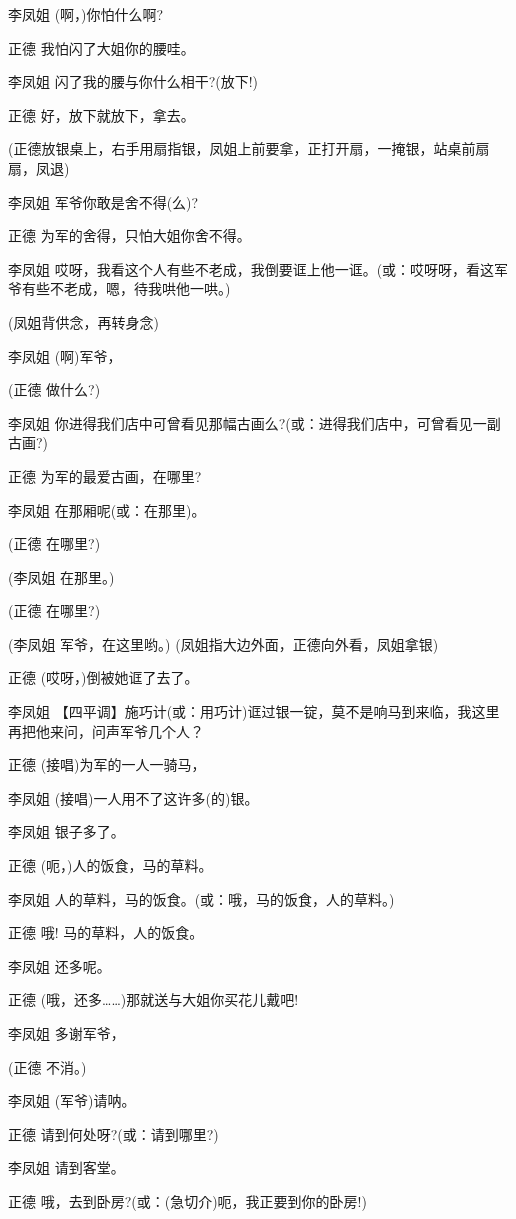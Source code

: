李凤姐 (啊，)你怕什么啊?

正德 我怕闪了大姐你的腰哇。

李凤姐 闪了我的腰与你什么相干?(放下!)

正德 好，放下就放下，拿去。

(正德放银桌上，右手用扇指银，凤姐上前要拿，正打开扇，一掩银，站桌前扇扇，凤退)

李凤姐 军爷你敢是舍不得(么)?

正德 为军的舍得，只怕大姐你舍不得。

李凤姐
哎呀，我看这个人有些不老成，我倒要诓上他一诓。(或：哎呀呀，看这军爷有些不老成，嗯，待我哄他一哄。)

(凤姐背供念，再转身念)

李凤姐 (啊)军爷，

(正德 做什么?)

李凤姐
你进得我们店中可曾看见那幅古画么?(或：进得我们店中，可曾看见一副古画?)

正德 为军的最爱古画，在哪里?

李凤姐 在那厢呢(或：在那里)。

(正德 在哪里?)

(李凤姐 在那里。)

(正德 在哪里?)

(李凤姐 军爷，在这里哟。) (凤姐指大边外面，正德向外看，凤姐拿银)

正德 (哎呀，)倒被她诓了去了。

李凤姐
【四平调】施巧计(或：用巧计)诓过银一锭，莫不是响马到来临，我这里再把他来问，问声军爷几个人？

正德 (接唱)为军的一人一骑马，

李凤姐 (接唱)一人用不了这许多(的)银。

李凤姐 银子多了。

正德 (呃，)人的饭食，马的草料。

李凤姐 人的草料，马的饭食。(或：哦，马的饭食，人的草料。)

正德 哦! 马的草料，人的饭食。

李凤姐 还多呢。

正德 (哦，还多\ldots{}\ldots{})那就送与大姐你买花儿戴吧!

李凤姐 多谢军爷，

(正德 不消。)

李凤姐 (军爷)请呐。

正德 请到何处呀?(或：请到哪里?)

李凤姐 请到客堂。

正德 哦，去到卧房?(或：(急切介)呃，我正要到你的卧房!)

